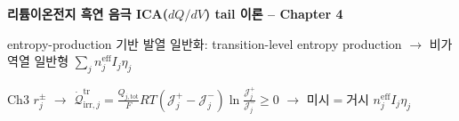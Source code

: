 \documentclass[11pt,a4paper]{article}
\newcommand{\eff}{\mathrm{eff}}
\newcommand{\tot}{\mathrm{tot}}
\newcommand{\irr}{\mathrm{irr}}
\newcommand{\tr}{\mathrm{tr}}
\begin{document}
\sloppy
\begin{center}
{\LARGE\bfseries 리튬이온전지 흑연 음극 ICA($dQ/dV$) tail 이론 -- Chapter 4\par}
\vspace{0.4em}
{\large entropy-production 기반 발열 일반화: transition-level entropy production $\to$
비가역열 일반형 $\sum_j n_j^{\eff}I_j\eta_j$\par}
\vspace{0.2em}
{\normalsize Ch3 $r_j^\pm$ $\to$ $\dot{\mathcal Q}_{\irr,j}^{\tr}{=}\tfrac{Q_{j,\tot}}{F}RT(\mathcal J_j^+{-}\mathcal J_j^-)\ln\tfrac{\mathcal J_j^+}{\mathcal J_j^-}\ge0$ $\to$ 미시$=$거시 $n_j^{\eff}I_j\eta_j$\par}
\end{center}

\end{document}
